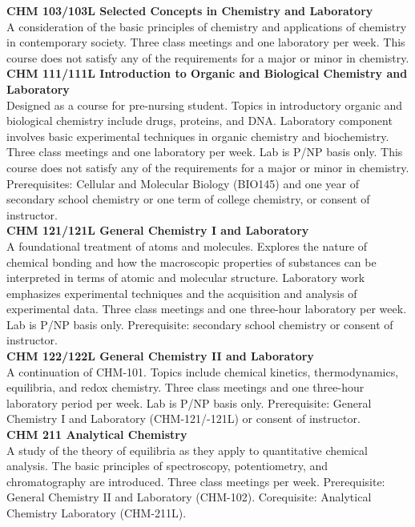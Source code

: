 \documentclass[
  letterpaper,
]{scrbook}
\begin{document}
\textbf{CHM 103/103L Selected Concepts in Chemistry and Laboratory}\\
A consideration of the basic principles of chemistry and applications of
chemistry in contemporary society. Three class meetings and one
laboratory per week. This course does not satisfy any of the
requirements for a major or minor in chemistry.\\
\textbf{CHM 111/111L Introduction to Organic and Biological Chemistry
and Laboratory}\\
Designed as a course for pre-nursing student. Topics in introductory
organic and biological chemistry include drugs, proteins, and DNA.
Laboratory component involves basic experimental techniques in organic
chemistry and biochemistry. Three class meetings and one laboratory per
week. Lab is P/NP basis only. This course does not satisfy any of the
requirements for a major or minor in chemistry. Prerequisites: Cellular
and Molecular Biology (BIO145) and one year of secondary school
chemistry or one term of college chemistry, or consent of instructor.\\
\textbf{CHM 121/121L General Chemistry I and Laboratory}\\
A foundational treatment of atoms and molecules. Explores the nature of
chemical bonding and how the macroscopic properties of substances can be
interpreted in terms of atomic and molecular structure. Laboratory work
emphasizes experimental techniques and the acquisition and analysis of
experimental data. Three class meetings and one three-hour laboratory
per week. Lab is P/NP basis only. Prerequisite: secondary school
chemistry or consent of instructor.\\
\textbf{CHM 122/122L General Chemistry II and Laboratory}\\
A continuation of CHM-101. Topics include chemical kinetics,
thermodynamics, equilibria, and redox chemistry. Three class meetings
and one three-hour laboratory period per week. Lab is P/NP basis only.
Prerequisite: General Chemistry I and Laboratory (CHM-121/-121L) or
consent of instructor.\\
\textbf{CHM 211 Analytical Chemistry}\\
A study of the theory of equilibria as they apply to quantitative
chemical analysis. The basic principles of spectroscopy, potentiometry,
and chromatography are introduced. Three class meetings per week.
Prerequisite: General Chemistry II and Laboratory (CHM-102).
Corequisite: Analytical Chemistry Laboratory (CHM-211L).\\
\end{document}

